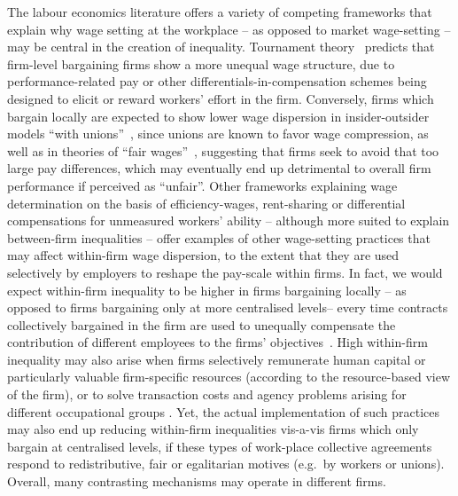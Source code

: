 \documentclass[12pt]{article}
\begin{document}
The labour economics literature offers a variety of competing
frameworks that explain why wage setting at the workplace -- as
opposed to market wage-setting -- may be central in the creation of
inequality.  Tournament theory~\citep{lazear.1979} predicts that
firm-level bargaining firms show a more unequal wage structure, due to
performance-related pay or other differentials-in-compensation schemes
being designed to elicit or reward workers' effort in the firm.
Conversely, firms which bargain locally are expected to show lower
wage dispersion in insider-outsider models ``with
unions''~\citep{lindbeck1986wage,lindbeck2001insiders}, since unions
are known to favor wage compression, as well as in theories of ``fair
wages''~\citep{akerlof.1984}, suggesting that firms seek to avoid that
too large pay differences, which may eventually end up detrimental to
overall firm performance if perceived as ``unfair''. Other frameworks
explaining wage determination on the basis of efficiency-wages,
rent-sharing or differential compensations for unmeasured workers'
ability -- although more suited to explain between-firm inequalities
-- offer examples of other wage-setting practices that may affect
within-firm wage dispersion, to the extent that they are used
selectively by employers to reshape the pay-scale within firms. In
fact, we would expect within-firm inequality to be higher in firms
bargaining locally -- as opposed to firms bargaining only at more
centralised levels-- every time contracts collectively bargained in
the firm are used to unequally compensate the contribution of
different employees to the firms'
objectives~\citep{bayo2013diffusion}. High within-firm inequality may
also arise when firms selectively remunerate human capital or
particularly valuable firm-specific resources (according to the
resource-based view of the firm), or to solve transaction costs and
agency problems arising for different occupational groups
\citep{eisenhardt1989agency,o1998structure}. Yet, the actual
implementation of such practices may also end up reducing within-firm
inequalities vis-a-vis firms which only bargain at centralised levels,
if these types of work-place collective agreements respond to
redistributive, fair or egalitarian motives (e.g.~by workers or
unions). Overall, many contrasting mechanisms may operate in different
firms.
\end{document}
